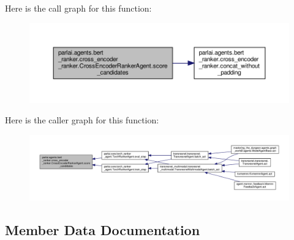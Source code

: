 Here is the call graph for this function\+:
\nopagebreak
\begin{figure}[H]
\begin{center}
\leavevmode
\includegraphics[width=350pt]{classparlai_1_1agents_1_1bert__ranker_1_1cross__encoder__ranker_1_1CrossEncoderRankerAgent_a8d75c4d4bddd44381b232a974469c432_cgraph}
\end{center}
\end{figure}
Here is the caller graph for this function\+:
\nopagebreak
\begin{figure}[H]
\begin{center}
\leavevmode
\includegraphics[width=350pt]{classparlai_1_1agents_1_1bert__ranker_1_1cross__encoder__ranker_1_1CrossEncoderRankerAgent_a8d75c4d4bddd44381b232a974469c432_icgraph}
\end{center}
\end{figure}


\subsection{Member Data Documentation}
\mbox{\label{classparlai_1_1agents_1_1bert__ranker_1_1cross__encoder__ranker_1_1CrossEncoderRankerAgent_a07990f2aca9e4da9d38ab8b70830a48f}} 
